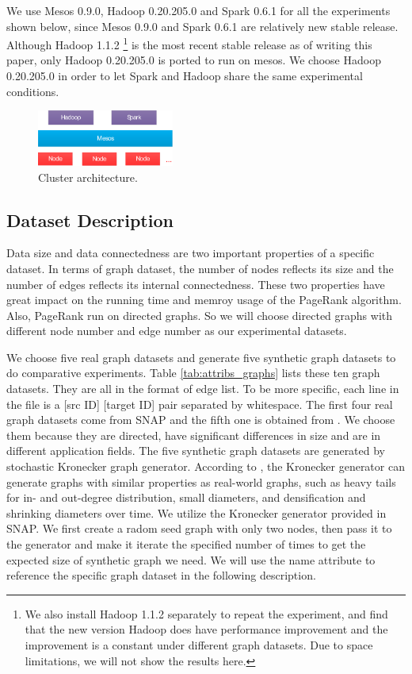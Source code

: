 \documentclass[10pt,conference,compsocconf]{IEEEtran}
\begin{document}
We use Mesos 0.9.0, Hadoop 0.20.205.0 and Spark 0.6.1 for all the experiments shown below, since  Mesos 0.9.0 and Spark 0.6.1 are relatively new stable release. Although Hadoop 1.1.2 \footnote{We also install Hadoop 1.1.2 separately to repeat the experiment, and find that the new version Hadoop does have performance improvement and the improvement is a constant under different graph datasets. Due to space limitations, we will not show the results here.} is the most recent stable release as of writing this paper, only Hadoop 0.20.205.0 is ported to run on mesos. We choose Hadoop 0.20.205.0 in order to let Spark and Hadoop share the same experimental conditions.
\begin{figure}[!t]
\centering
\includegraphics[width=0.4\textwidth]{figures/cluster-architect.eps}
\caption{Cluster architecture.}
\label{fig:cluster-architec}
\end{figure}


\subsection{Dataset Description}
\label{subsec:dataset_des}

Data size and data connectedness are two important properties of a specific dataset. In terms of graph dataset, the number of nodes reflects its size and the number of edges reflects its internal connectedness. These two properties have great impact on the running time and memroy usage of the PageRank algorithm. Also, PageRank run on directed graphs. So we will choose directed graphs with different node number and edge number as our experimental datasets.


We choose five real graph datasets and generate five synthetic graph datasets to do comparative experiments. Table \ref{tab:attribs_graphs} lists these ten graph datasets. They are all in the format of edge list. To be more specific, each line in the file is a [src ID] [target ID] pair separated by whitespace. The first four real graph datasets come from SNAP\cite{url_snap} and the fifth one is obtained from \cite{url_twitter_dataset}. We choose them because they are directed, have significant differences in size and are in different application fields. The five synthetic graph datasets are generated by stochastic Kronecker graph generator. According to \cite{jurij2005}, the Kronecker generator can generate graphs with similar properties as real-world graphs, such as heavy tails for in- and out-degree distribution, small diameters, and densification and shrinking diameters over time. We utilize the Kronecker generator provided in SNAP\cite{url_snap}. We first create a radom seed graph with only two nodes, then pass it to the generator and make it iterate the specified number of times to get the expected size of synthetic graph we need. We will use the name attribute to reference the specific graph dataset in the following description.
\end{document}
